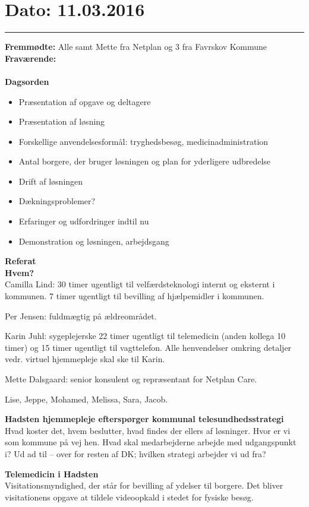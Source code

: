 

\section{Dato: 11.03.2016}
\hrule

\textbf{Fremmødte:} Alle samt Mette fra Netplan og 3 fra Favrskov Kommune
\textbf{Fraværende:} 
\\
\\
\textbf{Dagsorden}
\begin{itemize}
	\item Præsentation af opgave og deltagere
	\item Præsentation af løsning
		\item Forskellige anvendelsesformål: tryghedsbesøg, medicinadministration
		\item Antal borgere, der bruger løsningen og plan for yderligere udbredelse
		\item Drift af løsningen
		\item Dækningsproblemer? 
		\item Erfaringer og udfordringer indtil nu
	\item Demonstration og løsningen, arbejdsgang
\end{itemize}

\textbf{Referat} 
\\
\textbf{Hvem?}
\\
Camilla Lind: 30 timer ugentligt til velfærdsteknologi internt og eksternt i kommunen. 7 timer ugentligt til bevilling af hjælpemidler i kommunen. 

Per Jensen: fuldmægtig på ældreområdet.  

Karin Juhl: sygeplejerske  22 timer ugentligt til telemedicin (anden kollega 10 timer) og 15 timer ugentligt til vagttelefon. Alle henvendelser omkring detaljer vedr. virtuel hjemmepleje skal ske til Karin.

Mette Dalsgaard: senior konsulent og repræsentant for Netplan Care.

Lise, Jeppe, Mohamed, Melissa, Sara, Jacob.

\textbf{Hadsten hjemmepleje efterspørger kommunal telesundhedsstrategi}
\\
Hvad koster det, hvem beslutter, hvad findes der ellers af løsninger. Hvor er vi som kommune på vej hen. Hvad skal medarbejderne arbejde med udgangspunkt i? Ud ad til – over for resten af DK; hvilken strategi arbejder vi ud fra?

\textbf{Telemedicin i Hadsten}
\\
Visitationsmyndighed, der står for bevilling af ydelser til borgere. Det bliver visitationens opgave at tildele videoopkald i stedet for fysiske besøg. 

